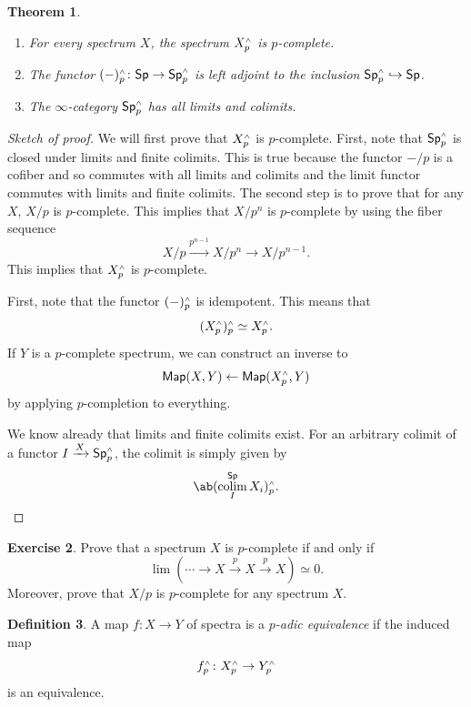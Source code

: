 \documentclass[10pt, oneside]{memoir}
\newtheorem{thm}{Theorem}[subsection]
\theoremstyle{definition}
\newtheorem{defn}[thm]{Definition}
\newtheorem{exer}[thm]{Exercise}
\theoremstyle{remark}
\theoremstyle{plain}
\theoremstyle{definition}
\theoremstyle{remark}
\newcommand{\ms}[1]{\mathsf{#1}}
\newcommand{\1}{\mathbf{1}}
\newcommand{\2}{\mathbf{2}}
\newcommand{\3}{\mathbf{3}}
\newcommand{\sw}{\mathsmaller{\wedge}}
\DeclareMathOperator*{\colim}{colim}
\begin{document}
\begin{thm}\leavevmode
    \begin{enumerate}
        \item For every spectrum \(X \), the spectrum \(X_p^{\sw} \) is \(p \)-complete.
        \item The functor \((-)_p^{\sw} \colon \ms{Sp} \to \ms{Sp}_p^{\sw} \) is left adjoint to the inclusion \(\ms{Sp}_p^{\sw} \hookrightarrow \ms{Sp} \).
        \item The \(\infty \)-category \(\ms{Sp}_p^{\sw} \) has all limits and colimits.
    \end{enumerate}
\end{thm}

\begin{proof}[Sketch of proof]
    We will first prove that \(X_p^{\sw} \) is \(p \)-complete. First, note that \(\ms{Sp}_p^{\sw} \) is closed under limits and finite colimits. This is true because the functor \(-/p \) is a cofiber and so commutes with all limits and colimits and the limit functor commutes with limits and finite colimits. The second step is to prove that for any \(X \), \(X/p \) is \(p \)-complete. This implies that \(X/p^n \) is \(p \)-complete by using the fiber sequence
    \[ X/p \xrightarrow{p^{n-1}} X/p^n \to X/p^{n-1}. \]
    This implies that \(X_p^{\sw} \) is \(p \)-complete.

    First, note that the functor \((-)_p^{\sw} \) is idempotent. This means that
    \[ (X_p^{\sw})_p^{\sw} \simeq X_p^{\sw}. \]
    If \(Y \) is a \(p \)-complete spectrum, we can construct an inverse to
    \[ \ms{Map}(X, Y) \gets \ms{Map}(X_p^{\sw}, Y) \]
    by applying \(p \)-completion to everything.

    We know already that limits and finite colimits exist. For an arbitrary colimit of a functor \(I \xrightarrow{X} \ms{Sp}_p^{\sw} \), the colimit is simply given by
    \[ \ab(\colim_I^{\ms{Sp}} X_i)_p^{\sw}. \qedhere \]
\end{proof}

\begin{exer}
    Prove that a spectrum \(X \) is \(p \)-complete if and only if
    \[ \lim (\cdots \to X \xrightarrow{p} X \xrightarrow{p} X) \simeq 0. \]
    Moreover, prove that \(X/p \) is \(p \)-complete for any spectrum \(X \).
\end{exer}

\begin{defn}
    A map \(f \colon X \to Y \) of spectra is a \textit{\(p \)-adic equivalence} if the induced map
    \[ f_p^{\sw} \colon X_p^{\sw} \to Y_p^{\sw} \]
    is an equivalence.
\end{defn}
\end{document}
